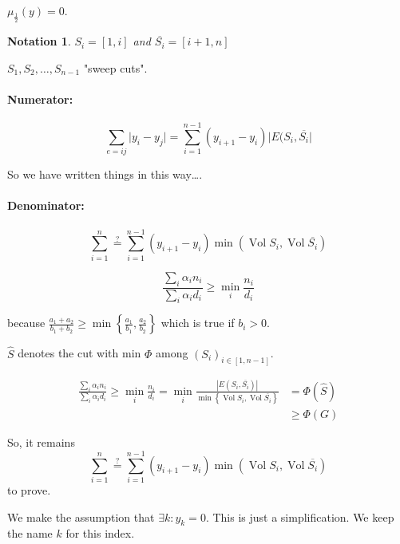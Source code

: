 \documentclass[12pt]{article}
\newtheorem{notation}{Notation}
\newcommand{\set}[1]{\left\{ #1 \right\}}
\newcommand{\brackets}[1]{\left[ #1 \right]}
\newcommand{\card}[1]{\left\lvert#1\right\rvert}
\DeclareMathOperator{\vol}{Vol}
\begin{document}
$\mu_{\frac{1}{2}}(y) = 0$.


\begin{notation}
    $S_i = \brackets{1,i}$ and $\overline{S_i} = \brackets{i+1,n}$
\end{notation}

$S_1, S_2,\ldots, S_{n-1}$ "sweep cuts".

\paragraph{Numerator:}

\[
    \sum\limits_{e=ij} \lvert y_i-y_j \rvert = \sum\limits_{i=1}^{n-1} (y_{i+1} - y_i) \lvert E(S_i, \overline{S_i} \rvert
\]

So we have written things in this way\dots.

\paragraph{Denominator:}


\[
    \sum\limits_{i=1}^n \overset{?}{=} \sum\limits_{i=1}^{n-1} (y_{i+1} - y_i) \min(\vol S_i, \vol \overline{S_i})
\]

\[
    \frac{\sum\limits_i \alpha_i n_i}{\sum\limits_i \alpha_i d_i} \geqslant \min\limits_i \frac{n_i}{d_i}
\]

because $\frac{a_1+a_2}{b_1+b_2} \geqslant \min\set{\frac{a_1}{b_1},\frac{a_2}{b_2}}$ which is true if $b_i > 0$.


$\hat{S}$ denotes the cut with min $\Phi$ among $(S_i)_{i\in\brackets{1,n-1}}$.


\[
    \begin{aligned}
        \frac{\sum\limits_i \alpha_i n_i}{\sum\limits_i \alpha_i d_i} \geqslant \min\limits_i \frac{n_i}{d_i} = \min_i \frac{\card{E(S_i,\overline{S_i})}}{\min\set{\vol S_i,\vol \overline{S_i}}} &= \Phi(\hat{S})\\
        &\geqslant \Phi(G)
    \end{aligned}
\]

So, it remains 
\[
    \sum\limits_{i=1}^n \overset{?}{=} \sum\limits_{i=1}^{n-1} (y_{i+1} - y_i) \min(\vol S_i, \vol \overline{S_i})
\]
to prove.



We make the assumption that $\exists k : y_k = 0$. This is just a simplification. We keep the name $k$ for this index.
\end{document}
